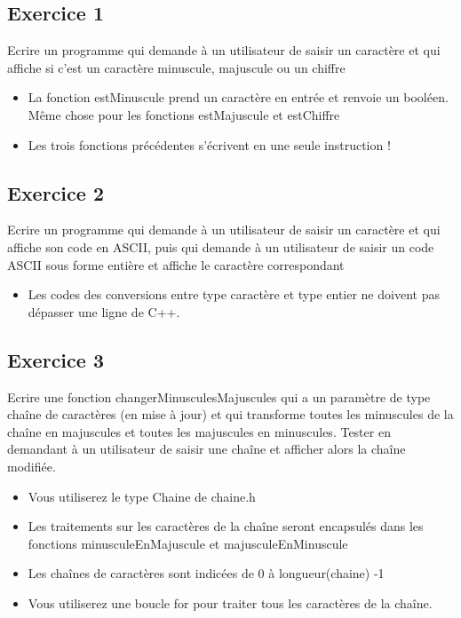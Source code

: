 \documentclass{article}
\begin{document}
		\subsection{Exercice 1}
			Ecrire un programme qui demande à un utilisateur de saisir un caractère et qui affiche si c'est un caractère minuscule, majuscule ou un chiffre
			\begin{itemize}
				\item La fonction estMinuscule prend un caractère en entrée et renvoie un booléen. Même chose pour les fonctions estMajuscule et estChiffre
				\item Les trois fonctions précédentes s'écrivent en une seule instruction !
			\end{itemize}
			
		\subsection{Exercice 2}
			Ecrire un programme qui demande à un utilisateur de saisir un caractère et qui affiche son code en ASCII, puis qui demande à un utilisateur de saisir un code ASCII sous forme entière et affiche le caractère correspondant
			\begin{itemize}
				\item Les codes des conversions entre type caractère et type entier ne doivent pas dépasser une ligne de C++.
			\end{itemize}				
			
		\subsection{Exercice 3}
			Ecrire une fonction changerMinusculesMajuscules qui a un paramètre de type chaîne de caractères (en mise à jour) et qui transforme toutes les minuscules de la chaîne en majuscules et toutes les majuscules en minuscules. Tester en demandant à un utilisateur de saisir une chaîne et afficher alors la chaîne modifiée.
			\begin{itemize}
				\item Vous utiliserez le type Chaine de chaine.h
				\item Les traitements sur les caractères de la chaîne seront encapsulés dans les fonctions minusculeEnMajuscule et majusculeEnMinuscule
				\item Les chaînes de caractères sont indicées de 0 à longueur(chaine) -1			
				\item Vous utiliserez une boucle for pour traiter tous les caractères de la chaîne.			
			\end{itemize}				
			
\end{document}
